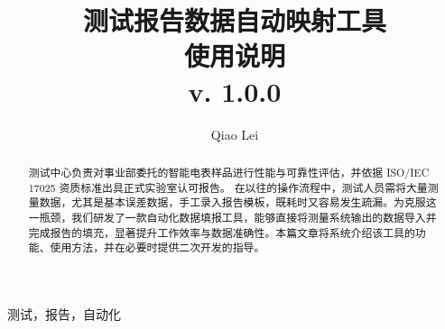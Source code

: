 




\title{测试报告数据自动映射工具\\使用说明 \\ \small{v. 1.0.0}}
\author{Qiao Lei}

\thispagestyle{fancy}

\maketitle

\clearpage

\renewcommand{\abstractname}{\Large\bfseries 摘要}

\setcounter{page}{2}

\begin{abstract}
测试中心负责对事业部委托的智能电表样品进行性能与可靠性评估，并依据 ISO/IEC 17025 资质标准出具正式实验室认可报告。
在以往的操作流程中，测试人员需将大量测量数据，尤其是基本误差数据，手工录入报告模板，既耗时又容易发生疏漏。为克服这一瓶颈，我们研发了一款自动化数据填报工具，能够直接将测量系统输出的数据导入并完成报告的填充，显著提升工作效率与数据准确性。本篇文章将系统介绍该工具的功能、使用方法，并在必要时提供二次开发的指导。
\end{abstract}


\begin{keywords}

测试，报告，自动化

\end{keywords}

\clearpage

\tableofcontents
\clearpage